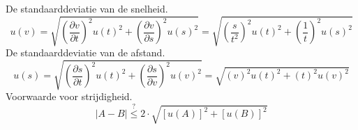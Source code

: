 \documentclass{report}
\begin{document}
\small{De standaarddeviatie van de snelheid. \cite{epo1-onzekerheden}}
\begin{equation}
\label{eq:velError}
u(v) = \sqrt{\left (\frac{\partial v }{\partial t }\right)^2 u(t)^2 + \left (\frac{\partial v }{\partial s }\right)^2 u(s)^2} = \sqrt{\left (\frac{s }{{t}^2 }\right)^2 u(t)^2 + \left (\frac{1}{t}\right)^2 u(s)^2}
\end{equation}
\small{De standaarddeviatie van de afstand. \cite{epo1-onzekerheden}}
\begin{equation}
\label{eq:distError}
u(s) = \sqrt{\left (\frac{\partial s }{\partial t }\right)^2 u(t)^2 + \left (\frac{\partial s }{\partial v }\right)^2 u(v)^2} = \sqrt{(v)^2 u(t)^2 + (t)^2 u(v)^2} 
\end{equation}
\small{Voorwaarde voor strijdigheid. \cite{epo1-onzekerheden}}
\begin{equation}
\label{eq:strijdigheid}
|A-B|\overset{?}{\le}2\cdot\sqrt{[u(A)]^2+[u(B)]^2}
\end{equation}
\end{document}
